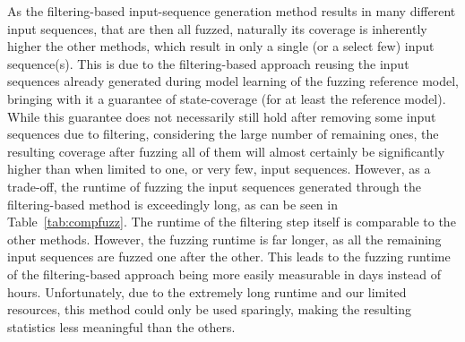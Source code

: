 As the filtering-based input-sequence generation method results in many different input sequences, that are then all fuzzed, naturally its coverage is inherently higher the other methods, which result in only a single (or a select few) input sequence(s). This is due to the filtering-based approach reusing the input sequences already generated during model learning of the fuzzing reference model, bringing with it a guarantee of state-coverage (for at least the reference model). While this guarantee does not necessarily still hold after removing some input sequences due to filtering, considering the large number of remaining ones, the resulting coverage after fuzzing all of them will almost certainly be significantly higher than when limited to one, or very few, input sequences. However, as a trade-off, the runtime of fuzzing the input sequences generated through the filtering-based method is exceedingly long, as can be seen in Table~\ref{tab:compfuzz}. The runtime of the filtering step itself is comparable to the other methods. However, the fuzzing runtime is far longer, as all the remaining input sequences are fuzzed one after the other. This leads to the fuzzing runtime of the filtering-based approach being more easily measurable in days instead of hours. Unfortunately, due to the extremely long runtime and our limited resources, this method could only be used sparingly, making the resulting statistics less meaningful than the others. 

